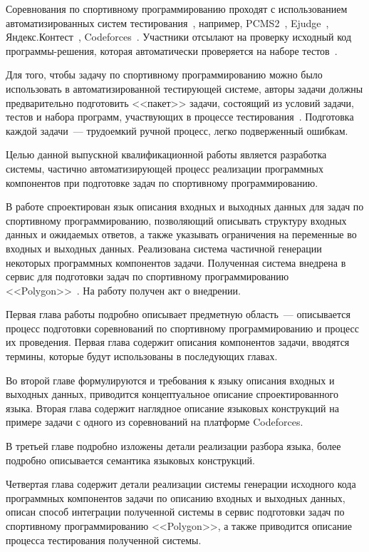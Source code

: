 \documentclass[times,specification,annotation]{style/itmo-student-thesis/itmo-student-thesis}
\begin{document}
\tableofcontents

\startprefacepage

Соревнования по спортивному программированию проходят с использованием автоматизированных систем тестирования~\cite{korneev-elizarov-pcms}, например, PCMS2~\cite{pcms2bachelor}, Ejudge~\cite{ejudgedocs}, Яндекс.Контест~\cite{yacontest}, Codeforces~\cite{codeforces}. Участники отсылают на проверку исходный код программы-решения, которая автоматически проверяется на наборе тестов~\cite{competative-prog-wiki}.

Для того, чтобы задачу по спортивному программированию можно было использовать в автоматизированной тестирующей системе, авторы задачи должны предварительно подготовить <<пакет>> задачи, состоящий из условий задачи, тестов и набора программ, участвующих в процессе тестирования~\cite{darkcyan-polygon-tutorial}. Подготовка каждой задачи~--- трудоемкий ручной процесс, легко подверженный ошибкам.

Целью данной выпускной квалификационной работы является разработка системы, частично автоматизирующей процесс реализации программных компонентов при подготовке задач по спортивному программированию.

В работе спроектирован язык описания входных и выходных данных для задач по спортивному программированию, позволяющий описывать структуру входных данных и ожидаемых ответов, а также указывать ограничения на переменные во входных и выходных данных. Реализована система частичной генерации некоторых программных компонентов задачи. Полученная система внедрена в сервис для подготовки задач по спортивному программированию <<Polygon>>~\cite{polygon}. На работу получен акт о внедрении.

Первая глава работы подробно описывает предметную область~--- описывается процесс подготовки соревнований по спортивному программированию и процесс их проведения. Первая глава содержит описания компонентов задачи, вводятся термины, которые будут использованы в последующих главах.

Во второй главе формулируются и требования к языку описания входных и выходных данных, приводится концептуальное описание спроектированного языка. Вторая глава содержит наглядное описание языковых конструкций на примере задачи с одного из соревнований на платформе Codeforces.

В третьей главе подробно изложены детали реализации разбора языка, более подробно описывается семантика языковых конструкций.

Четвертая глава содержит детали реализации системы генерации исходного кода программных компонентов задачи по описанию входных и выходных данных, описан способ интеграции полученной системы в сервис подготовки задач по спортивному программированию <<Polygon>>, а также приводится описание процесса тестирования полученной системы.
\end{document}
